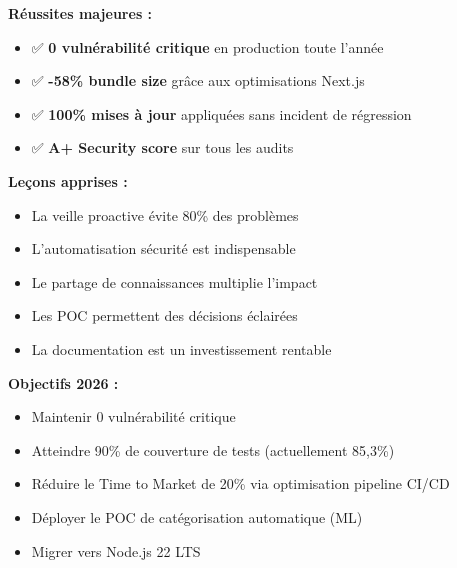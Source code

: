 \begin{tcolorbox}[colback=green!5!white,colframe=green!60!black,title=\textbf{Bilan de la veille technologique 2025}]
\textbf{Réussites majeures :}
\begin{itemize}
    \item ✅ \textbf{0 vulnérabilité critique} en production toute l'année
    \item ✅ \textbf{-58\% bundle size} grâce aux optimisations Next.js
    \item ✅ \textbf{100\% mises à jour} appliquées sans incident de régression
    \item ✅ \textbf{A+ Security score} sur tous les audits
\end{itemize}

\textbf{Leçons apprises :}
\begin{itemize}
    \item La veille proactive évite 80\% des problèmes
    \item L'automatisation sécurité est indispensable
    \item Le partage de connaissances multiplie l'impact
    \item Les POC permettent des décisions éclairées
    \item La documentation est un investissement rentable
\end{itemize}

\textbf{Objectifs 2026 :}
\begin{itemize}
    \item Maintenir 0 vulnérabilité critique
    \item Atteindre 90\% de couverture de tests (actuellement 85,3\%)
    \item Réduire le Time to Market de 20\% via optimisation pipeline CI/CD
    \item Déployer le POC de catégorisation automatique (ML)
    \item Migrer vers Node.js 22 LTS
\end{itemize}
\end{tcolorbox}


